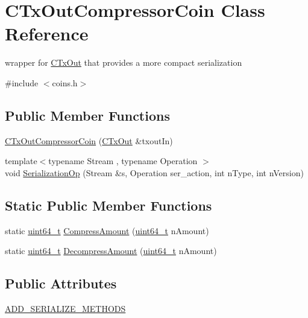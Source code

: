 \hypertarget{class_c_tx_out_compressor_coin}{}\section{C\+Tx\+Out\+Compressor\+Coin Class Reference}
\label{class_c_tx_out_compressor_coin}


wrapper for \hyperlink{class_c_tx_out}{C\+Tx\+Out} that provides a more compact serialization  




{\ttfamily \#include $<$coins.\+h$>$}

\subsection*{Public Member Functions}
\begin{DoxyCompactItemize}
\item 
\hyperlink{class_c_tx_out_compressor_coin_aeea5297daa811b08b035703018eb1044}{C\+Tx\+Out\+Compressor\+Coin} (\hyperlink{class_c_tx_out}{C\+Tx\+Out} \&txout\+In)
\item 
{\footnotesize template$<$typename Stream , typename Operation $>$ }\\void \hyperlink{class_c_tx_out_compressor_coin_af04e3ec57767b22e69c9596865575666}{Serialization\+Op} (Stream \&s, Operation ser\+\_\+action, int n\+Type, int n\+Version)
\end{DoxyCompactItemize}
\subsection*{Static Public Member Functions}
\begin{DoxyCompactItemize}
\item 
static \hyperlink{stdint_8h_aaa5d1cd013383c889537491c3cfd9aad}{uint64\+\_\+t} \hyperlink{class_c_tx_out_compressor_coin_a9ce8ffc644da7218f91d5390fd835e36}{Compress\+Amount} (\hyperlink{stdint_8h_aaa5d1cd013383c889537491c3cfd9aad}{uint64\+\_\+t} n\+Amount)
\item 
static \hyperlink{stdint_8h_aaa5d1cd013383c889537491c3cfd9aad}{uint64\+\_\+t} \hyperlink{class_c_tx_out_compressor_coin_afc4ea4c94e9a935b0e18621aef621574}{Decompress\+Amount} (\hyperlink{stdint_8h_aaa5d1cd013383c889537491c3cfd9aad}{uint64\+\_\+t} n\+Amount)
\end{DoxyCompactItemize}
\subsection*{Public Attributes}
\begin{DoxyCompactItemize}
\item 
\hyperlink{class_c_tx_out_compressor_coin_ad61bf48ec0d5d0f53c3232b398f293c0}{A\+D\+D\+\_\+\+S\+E\+R\+I\+A\+L\+I\+Z\+E\+\_\+\+M\+E\+T\+H\+O\+D\+S}
\end{DoxyCompactItemize}



